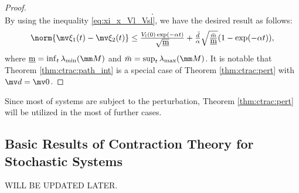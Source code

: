 \begin{proof}
\begin{equation}
        .
    \end{equation}
    By using the inequality \eqref{eq:xi_x_Vl_Vsl}, we have the desired result as follows:
    \begin{equation}
        \norm{\mv\xi_1(t)-\mv\xi_2(t)}
        \le
        \tfrac{V_{l}(0) \exp(-\alpha t)}{\sqrt{\underbar{m}}}
        +
        \tfrac{\bar d}{\alpha}
        \sqrt{\tfrac{\bar m}{\underbar m}}
        (1-\exp(-\alpha t))
        ,
    \end{equation}
    where $\underbar m=\inf_t\lambda_{\min}(\mm M)$ and $\bar m=\sup_t\lambda_{\max}(\mm M)$.
    It is notable that Theorem \ref{thm:ctrac:path_int} is a special case of Theorem \ref{thm:ctrac:pert} with $\bdd=\mv 0$.
\end{proof}

Since most of systems are subject to the perturbation, Theorem \ref{thm:ctrac:pert} will be utilized in the most of further cases.

\subsection{Basic Results of Contraction Theory for Stochastic Systems}

\color{red}
WILL BE UPDATED LATER.
\color{black}